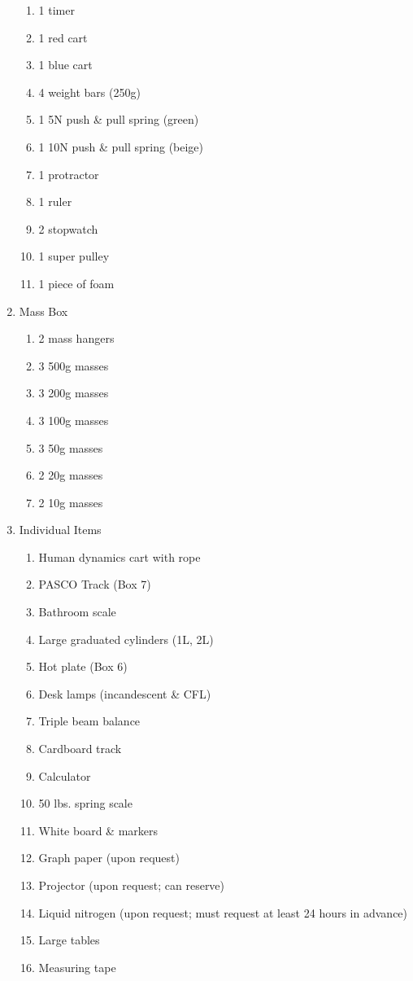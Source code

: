 \documentclass[10pt]{article}
\begin{document}
\begin{enumerate}
\begin{enumerate}
\item 1 timer
\item 1 red cart
\item 1 blue cart
\item 4 weight bars (250g)
\item 1 5N push \& pull spring (green)
\item 1 10N push \& pull spring (beige)
\item 1 protractor
\item 1 ruler
\item 2 stopwatch
\item 1 super pulley
\item 1 piece of foam
\end{enumerate}
\item Mass Box
\begin{enumerate}
\item 2 mass hangers
\item 3 500g masses
\item 3 200g masses
\item 3 100g masses
\item 3 50g masses
\item 2 20g masses
\item 2 10g masses
\end{enumerate}

\item Individual Items
\begin{enumerate}
\item Human dynamics cart with rope
\item PASCO Track (Box 7)
\item Bathroom scale
\item Large graduated cylinders (1L, 2L)
\item Hot plate (Box 6)
\item Desk lamps (incandescent \& CFL)
\item Triple beam balance
\item Cardboard track
\item Calculator
\item 50 lbs. spring scale
\item White board \& markers 
\item Graph paper (upon request)
\item Projector (upon request; can reserve)
\item Liquid nitrogen (upon request; must request at least 24 hours in advance)
\item Large tables
\item Measuring tape
\end{enumerate}
\end{enumerate}
\end{document}
